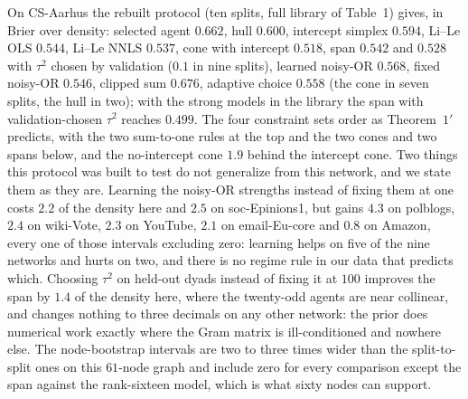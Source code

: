 \documentclass[12pt]{article}
\begin{document}
On CS-Aarhus the rebuilt protocol (ten splits, full library of Table~1) gives, in Brier over density: selected agent $0.662$, hull $0.600$, intercept simplex $0.594$, Li--Le OLS $0.544$, Li--Le NNLS $0.537$, cone with intercept $0.518$, span $0.542$ and $0.528$ with $\tau^2$ chosen by validation ($0.1$ in nine splits), learned noisy-OR $0.568$, fixed noisy-OR $0.546$, clipped sum $0.676$, adaptive choice $0.558$ (the cone in seven splits, the hull in two); with the strong models in the library the span with validation-chosen $\tau^2$ reaches $0.499$. The four constraint sets order as Theorem~$1'$ predicts, with the two sum-to-one rules at the top and the two cones and two spans below, and the no-intercept cone $1.9$ behind the intercept cone. Two things this protocol was built to test do not generalize from this network, and we state them as they are. Learning the noisy-OR strengths instead of fixing them at one costs $2.2$ of the density here and $2.5$ on soc-Epinions1, but gains $4.3$ on polblogs, $2.4$ on wiki-Vote, $2.3$ on YouTube, $2.1$ on email-Eu-core and $0.8$ on Amazon, every one of those intervals excluding zero: learning helps on five of the nine networks and hurts on two, and there is no regime rule in our data that predicts which. Choosing $\tau^2$ on held-out dyads instead of fixing it at $100$ improves the span by $1.4$ of the density here, where the twenty-odd agents are near collinear, and changes nothing to three decimals on any other network: the prior does numerical work exactly where the Gram matrix is ill-conditioned and nowhere else. The node-bootstrap intervals are two to three times wider than the split-to-split ones on this $61$-node graph and include zero for every comparison except the span against the rank-sixteen model, which is what sixty nodes can support.
\end{document}
